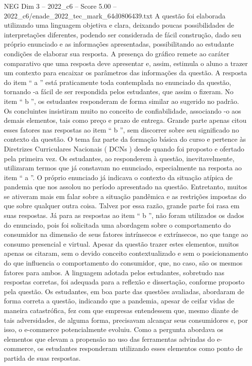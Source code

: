 \begin{textsample}{NEG Dim 3 – 2022\_c6 – Score 5.00 – 2022\_c6/enade\_2022\_tec\_mark\_64d0806439.txt}
A questão foi elaborada utilizando uma linguagem objetiva e clara, deixando poucas possibilidades de interpretações diferentes, podendo ser considerada de fácil construção, dado seu próprio enunciado e as informações apresentadas, possibilitando ao estudante condições de elaborar sua resposta.
A presença do gráfico remete ao caráter comparativo que uma resposta deve apresentar e, assim, estimula o aluno a trazer um contexto para encaixar os parâmetros das informações da questão.
A resposta do item “ a ” está praticamente toda contemplada no enunciado da questão, tornando -a fácil de ser respondida pelos estudantes, que assim o fizeram.
No item “ b ”, os estudantes responderam de forma similar ao sugerido no padrão.
Os concluintes insistiram muito no conceito de confiabilidade, associando -o aos demais elementos, tais como preço e prazo de entrega.
Grande parte apenas citou esses fatores nas respostas ao item “ b ”, sem discorrer sobre seu significado no contexto da questão.
O tema faz parte da formação básica do curso e pertence às Diretrizes Curriculares Nacionais ( DCNs ) desde quando foi proposto e ofertado pela primeira vez.
Os estudantes, ao responderem à questão, inevitavelmente, utilizaram termos que já constavam no enunciado, especialmente na resposta ao item “ a ”.
O próprio enunciado já indicava o contexto da situação atípica de pandemia que nos assolou no período apresentado na questão.
Entretanto, muitos se ativeram mais em falar sobre a situação pandêmica e as restrições impostas do que sobre qualquer outra coisa.
Talvez por essa razão, grande parte foi rasa em suas respostas.
Já para as respostas ao item “ b ”, não foram utilizados os dados do enunciado, pois foi solicitada uma abordagem sobre o comportamento do consumidor na dimensão de seus fatores intrínsecos e extrínsecos, no que tange ao consumo presencial e virtual.
Apesar da questão trazer estes elementos, muitos apenas os citaram, sem o devido conceito contextualizado e sem o posicionamento do que influencia o comportamento do consumidor, que, no caso, são os mesmos fatores para ambos.
A linguagem adotada pelos estudantes, sobretudo nas respostas corretas, foi adequada para a reflexão e dissertação, conforme proposto pela questão.
Os estudantes, em boa parte das questões avaliadas, abordaram de forma correta a questão, indicando que a pandemia, apesar de ceifar vidas de maneira catastrófica, fez com que empresas entendessem que, mesmo diante de tais adversidades, de alguma forma, precisavam alcançar seus consumidores e, por isso, o e-commerce potencialmente evoluiu.
Como a pergunta abordava os elementos que elevam a propensão no uso das ferramentas advindas do e-commerce, os estudantes responderam utilizando esses elementos como ponto de partida de suas respostas.

\end{textsample}
